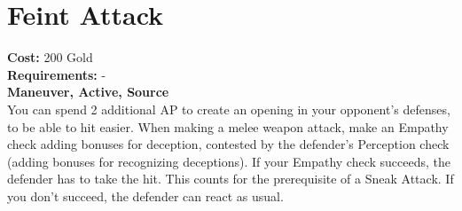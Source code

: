 \section{Feint Attack}
\textbf{Cost:} 200 Gold\\
\textbf{Requirements:} -\\
\textbf{Maneuver, Active, Source}\\
You can spend 2 additional AP to create an opening in your opponent’s defenses, to be able to hit easier. When making a melee weapon attack, make an Empathy check adding bonuses for deception, contested by the defender’s Perception check (adding bonuses for recognizing deceptions). If your Empathy check succeeds, the defender has to take the hit. This counts for the prerequisite of a Sneak Attack. If you don’t succeed, the defender can react as usual.\\